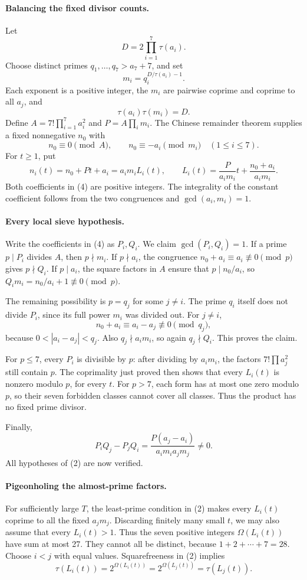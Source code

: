 \paragraph{Balancing the fixed divisor counts.}
Let
\[
 D=2\prod_{i=1}^7\tau(a_i).
\]
Choose distinct primes \(q_1,\ldots,q_7>a_7+7\), and set
\[
 m_i=q_i^{D/\tau(a_i)-1}.
\]
Each exponent is a positive integer, the \(m_i\) are pairwise coprime and coprime to all \(a_j\), and
\[
 \tau(a_i)\tau(m_i)=D. \tag{3}
\]
Define \(A=7!\prod_{i=1}^7a_i^2\) and \(P=A\prod_i m_i\). The Chinese remainder theorem supplies a fixed nonnegative \(n_0\) with
\[
 n_0\equiv0\pmod A,\qquad n_0\equiv-a_i\pmod{m_i}\quad(1\leq i\leq7).
\]
For \(t\geq1\), put
\[
 n_i(t)=n_0+Pt+a_i=a_i m_i L_i(t),\qquad
 L_i(t)=\frac{P}{a_i m_i}t+\frac{n_0+a_i}{a_i m_i}. \tag{4}
\]
Both coefficients in (4) are positive integers. The integrality of the constant coefficient follows from the two congruences and \(\gcd(a_i,m_i)=1\).

\paragraph{Every local sieve hypothesis.}
Write the coefficients in (4) as \(P_i,Q_i\). We claim \(\gcd(P_i,Q_i)=1\). If a prime \(p\mid P_i\) divides \(A\), then \(p\nmid m_i\). If \(p\nmid a_i\), the congruence \(n_0+a_i\equiv a_i\not\equiv0\pmod p\) gives \(p\nmid Q_i\). If \(p\mid a_i\), the square factors in \(A\) ensure that \(p\mid n_0/a_i\), so \(Q_i m_i=n_0/a_i+1\not\equiv0\pmod p\).

The remaining possibility is \(p=q_j\) for some \(j\ne i\). The prime \(q_i\) itself does not divide \(P_i\), since its full power \(m_i\) was divided out. For \(j\ne i\),
\[
 n_0+a_i\equiv a_i-a_j\not\equiv0\pmod{q_j},
\]
because \(0<|a_i-a_j|<q_j\). Also \(q_j\nmid a_i m_i\), so again \(q_j\nmid Q_i\). This proves the claim.

For \(p\leq7\), every \(P_i\) is divisible by \(p\): after dividing by \(a_i m_i\), the factors \(7!\prod a_j^2\) still contain \(p\). The coprimality just proved then shows that every \(L_i(t)\) is nonzero modulo \(p\), for every \(t\). For \(p>7\), each form has at most one zero modulo \(p\), so their seven forbidden classes cannot cover all classes. Thus the product has no fixed prime divisor.

Finally,
\[
 P_iQ_j-P_jQ_i
 =\frac{P(a_j-a_i)}{a_i m_i a_j m_j}\ne0.
\]
All hypotheses of (2) are now verified.

\paragraph{Pigeonholing the almost-prime factors.}
For sufficiently large \(T\), the least-prime condition in (2) makes every \(L_i(t)\) coprime to all the fixed \(a_jm_j\). Discarding finitely many small \(t\), we may also assume that every \(L_i(t)>1\). Thus the seven positive integers \(\Omega(L_i(t))\) have sum at most 27. They cannot all be distinct, because \(1+2+\cdots+7=28\). Choose \(i<j\) with equal values. Squarefreeness in (2) implies
\[
 \tau(L_i(t))=2^{\Omega(L_i(t))}
             =2^{\Omega(L_j(t))}=\tau(L_j(t)). \tag{5}
\]


